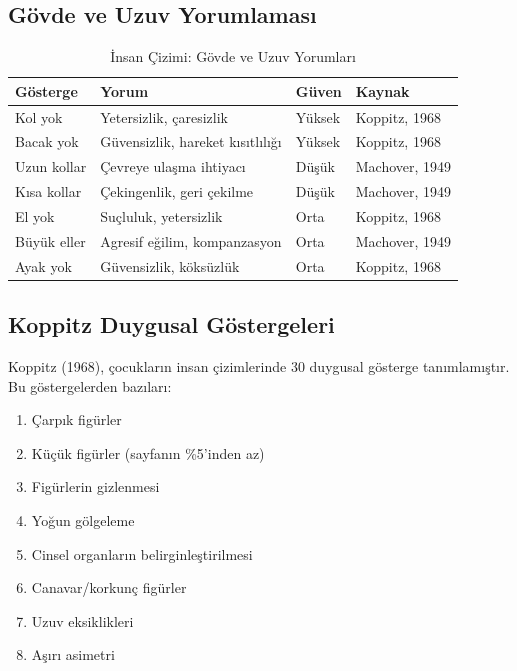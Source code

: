 \subsection{Gövde ve Uzuv Yorumlaması}

\begin{table}[H]
\centering
\caption{İnsan Çizimi: Gövde ve Uzuv Yorumları}
\label{tab:insangovde}
\begin{tabular}{p{3.5cm}p{5.5cm}p{2cm}p{2cm}}
\toprule
\textbf{Gösterge} & \textbf{Yorum} & \textbf{Güven} & \textbf{Kaynak} \\
\midrule
Kol yok & Yetersizlik, çaresizlik & Yüksek & Koppitz, 1968 \\
Bacak yok & Güvensizlik, hareket kısıtlılığı & Yüksek & Koppitz, 1968 \\
Uzun kollar & Çevreye ulaşma ihtiyacı & Düşük & Machover, 1949 \\
Kısa kollar & Çekingenlik, geri çekilme & Düşük & Machover, 1949 \\
El yok & Suçluluk, yetersizlik & Orta & Koppitz, 1968 \\
Büyük eller & Agresif eğilim, kompanzasyon & Orta & Machover, 1949 \\
Ayak yok & Güvensizlik, köksüzlük & Orta & Koppitz, 1968 \\
\bottomrule
\end{tabular}
\end{table}

\subsection{Koppitz Duygusal Göstergeleri}

Koppitz (1968), çocukların insan çizimlerinde 30 duygusal gösterge tanımlamıştır. Bu göstergelerden bazıları:

\begin{enumerate}
  \item Çarpık figürler
  \item Küçük figürler (sayfanın \%5'inden az)
  \item Figürlerin gizlenmesi
  \item Yoğun gölgeleme
  \item Cinsel organların belirginleştirilmesi
  \item Canavar/korkunç figürler
  \item Uzuv eksiklikleri
  \item Aşırı asimetri
\end{enumerate}

